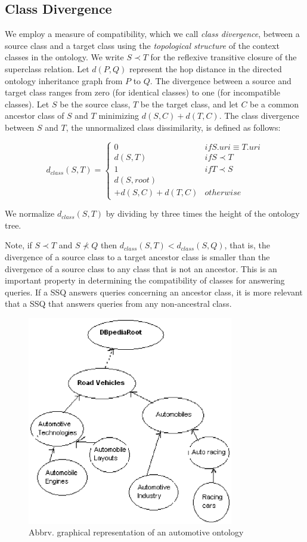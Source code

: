 \subsection{Class Divergence}
\label{sec:ctd}
We employ a measure of compatibility, which we call \textit{class
  divergence}, between a source class and a target class using the
\textit{topological structure} of the context classes in the
ontology. We write $S \prec T$ for the reflexive transitive closure of
the superclass relation. Let $d(P,Q)$ represent the hop distance in
the directed ontology inheritance graph from $P$ to $Q$. The
divergence between a source and target class ranges from zero (for
identical classes) to one (for incompatible classes).  Let $S$ be the
source class, $T$ be the target class, and let $C$ be a common
ancestor class of $S$ and $T$ minimizing $d(S,C) + d(T,C)$. The class
divergence between $S$ and $T$, the unnormalized class dissimilarity,
is defined as follows:

\begin{equation}
d_{class}(S, T) = \begin{cases}
0 & if S.{uri} \equiv T.{uri}\\
d(S, T) & if S \prec T\\
1 & if T \prec S\\
d(S,root) \\+ d(S,C) + d(T,C) & otherwise
\end{cases}
\end{equation}

We normalize $d_{class}(S, T)$ by dividing by three times the height
of the ontology tree.

Note, if $S \prec T$ and $S \not\prec Q$ then $d_{class}(S,T) <
d_{class}(S,Q)$, that is, the divergence of a source class to a target
ancestor class is smaller than the divergence of a source class to any
class that is not an ancestor. This is an important property in
determining the compatibility of classes for answering queries.  If a
SSQ answers queries concerning an ancestor class, it is more relevant
that a SSQ that answers queries from any non-ancestral class.

\begin{figure}[t]
\centering
\includegraphics[width=90mm]{class_divergence.eps}
\caption{Abbrv. graphical representation of an automotive ontology}
\label{fig:class_divergence}
\end{figure}

